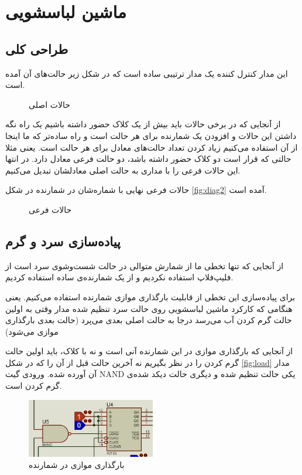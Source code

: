 \chapter{
ماشین لباسشویی
}
\section{
طراحی کلی
}
این مدار کنترل کننده یک مدار ترتیبی ساده است که در شکل زیر حالت‌های آن آمده است. 

\begin{figure}[h!]
    \centering
    
    \caption{
    حالات اصلی
    }
    \label{fig:diag2}
\end{figure}

از آنجایی که در برخی حالات باید بیش از یک کلاک حضور داشته باشیم یک راه نگه داشتن این حالات و افزودن یک شمارنده برای هر حالت است و راه ساده‌تر که ما اینجا از آن استفاده می‌کنیم زیاد کردن تعداد حالت‌های معادل برای هر حالت است. یعنی مثلا حالتی که قرار است دو کلاک حضور داشته باشد، دو حالت فرعی معادل دارد.
در انتها این حالات فرعی را با مداری به حالت اصلی معادلشان تبدیل می‌کنیم.

حالات فرعی نهایی با شماره‌شان در شمارنده در شکل 
\eqref{fig:diag2}
آمده است.

\begin{figure}[h!]
    \centering
    
    \caption{
    حالات فرعی
    }
    \label{fig:diag2}
\end{figure}

\section{
پیاده‌سازی سرد و گرم
}
از آنجایی که تنها تخطی ما از شمارش متوالی در حالت شست‌وشوی سرد است از فلیپ‌فلاپ استفاده نکردیم و از یک شمارنده‌ی ساده استفاده کردیم.

برای پیاده‌سازی این تخطی از قابلیت بارگذاری موازی شمارنده استفاده می‌کنیم.
یعنی هنگامی که کارکرد ماشین لباسشویی روی حالت سرد تنظیم شده مدار وقتی به اولین حالت گرم کردن آب می‌رسد درجا به حالت اصلی بعدی می‌پرد (حالت بعدی بارگذاری موازی می‌شود)

از آنجایی که بارگذاری موازی در این شمارنده آنی است و نه با کلاک، باید اولین حالت گرم کردن را در نظر بگیریم نه آخرین حالت قبل از آن را که در شکل
\eqref{fig:load}
مدار آن آورده شده.
ورودی گیت
NAND
یکی حالت تنظیم شده و دیگری حالت دیکد شده‌ی گرم کردن است.

\begin{figure}[h!]
    \centering
    \includegraphics[width=0.5\textwidth]{part1/2.png}
    \caption{
    بارگذاری موازی در شمارنده
    }
    \label{fig:load}
\end{figure}

